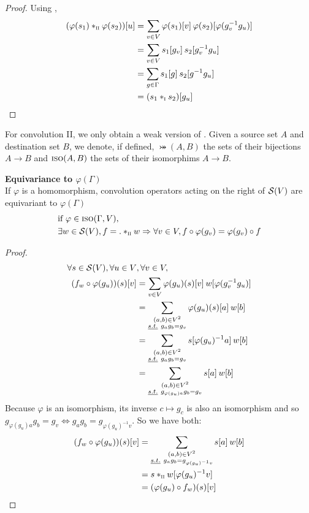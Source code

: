 \begin{proof}
Using ,
\begin{align*}
(\varphi(s_1) \ast_{\II} \varphi(s_2))[u] & = \displaystyle \sum_{v \in V} \varphi(s_1)[v] \h{2} \varphi(s_2)[\varphi(g_v^{-1}g_u)]\\
 & = \displaystyle \sum_{v \in V} s_1[g_v] \h{2} s_2[g_v^{-1}g_u]\\
 & = \displaystyle \sum_{g \in \Gamma} s_1[g] \h{2} s_2[g^{-1}g_u]\\
 & = (s_1 \ast_{\I} s_2)[g_u]
\end{align*}
\end{proof}

For convolution II, we only obtain a weak version of . Given a source set $A$ and destination set $B$, we denote, if defined, $\bij(A,B)$ the sets of their bijections $A \to B$ and $\iso(A,B)$ the sets of their isomorphims $A \to B$.

\begin{proposition}\textbf{Equivariance to $\varphi(\Gamma)$}\\
If $\varphi$ is a homomorphism, convolution operators acting on the right of $\cs(V)$ are equivariant to $\varphi(\Gamma)$ \ie
\begin{align*}
& \text{if } \varphi \in \iso(\Gamma, V),\\
& \exists w \in \cs(V), f = . \ast_{\II} w \Rightarrow \forall v \in V, f \circ \varphi(g_v) = \varphi(g_v) \circ f
\end{align*}
\label{prop:equiV}
\end{proposition}

\begin{proof}
\begin{align*}
\forall s \in \cs(V), \forall u \in V & ,\forall v \in V,\\
(f_w \circ \varphi(g_u)) (s) [v]
& = \displaystyle \sum_{v \in V} \varphi(g_u)(s)[v] \h{2} w[\varphi(g_v^{-1}g_u)]\\
& = \sum_{\substack{(a,b) \in V^2 \\ \st g_ag_b=g_v }} \varphi(g_u)(s)[a] \h{2} w[b]\\
& = \sum_{\substack{(a,b) \in V^2 \\ \st g_ag_b=g_v }} s[\varphi(g_u)^{-1}a] \h{2} w[b]\\
& = \sum_{\substack{(a,b) \in V^2 \\ \st g_{\varphi(g_u)a}g_b=g_v }} s[a] \h{2} w[b]\\
\end{align*}
Because $\varphi$ is an isomorphism, its inverse $c \mapsto g_c$ is also an isomorphism and so $g_{\varphi(g_u)a}g_b=g_v \Leftrightarrow g_{a}g_b=g_{\varphi(g_u)^{-1}v}$. So we have both:
\begin{align*}
(f_w \circ \varphi(g_u)) (s) [v] & = \sum_{\substack{(a,b) \in V^2 \\ \st g_{a}g_b=g_{\varphi(g_u)^{-1}v} }} s[a] \h{2} w[b]\\
& = s \ast_{\II} w [\varphi(g_u)^{-1}v]\\
& = (\varphi(g_u) \circ f_w) (s) [v]
\end{align*}
\end{proof}

